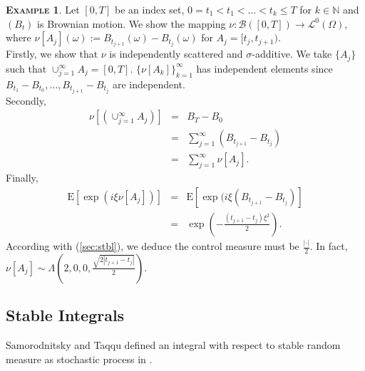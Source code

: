 \documentclass[a4paper, twoside, 11pt]{article}
\theoremstyle{definition}
\newtheorem{example}[definition]{\scshape Example}
\newcommand{\brkt}[1]{\left({#1} \right)}
\begin{document}
  \begin{example}
	Let $[0, T]$ be an index set, $0= t_1 < t_1 <\dots < t_k \le T$ for $k\in \mathbb{N}$ and $(B_{t})$ is Brownian motion.  We show the mapping $\nu : \mathscr{B}([0, T]) \rightarrow \mathcal{L}^0(\Omega)$, where $\nu[A_j](\omega):= B_{t_{j+1}}(\omega) - B_{t_{j}}(\omega)$ for $A_j=[t_{j}, t_{j+1})$.\\
	  Firstly, we show that $\nu$ is independently scattered and $\sigma$-additive. We take $\{A_j\}$ such that $\cup_{j=1}^{\infty}A_j = [0, T]$. $\{\nu[A_k]\}_{k=1}^{\infty}$ has independent elements since $B_{t_1} - B_{t_0}, \dots,  B_{t_{j+1}}- B_{t_{j}} $ are independent.\\
	  Secondly, 
	  \begin{eqnarray*}
		\nu[\brkt{\cup_{j=1}^{\infty}A_j}] &=& B_T - B_{0}\\
		&=& \sum_{j=1}^{\infty} (B_{t_{j+1}} - B_{t_j})\\
		&=& \sum_{j=1}^{\infty} \nu[A_j].
	  \end{eqnarray*}
	  Finally, 
	  \begin{eqnarray*}
		\mathrm{E}[\exp(i\xi\nu[A_j])] &=& \mathrm{E}[\exp(i\xi(B_{t_{j+1}} - B_{t_{j}})]\\
		&=& \exp(-\frac{(t_{j+1}-t_j)\xi^2}{2}).
	  \end{eqnarray*}
	  According with (\ref{sec:stbl}), we deduce the control measure must be $\frac{|\cdot|}{2}$. In fact, $\nu[A_j] \sim \Lambda(2, 0, 0, \frac{\sqrt{2|t_{j+1} - t_j|}}{2})$.
	\label{sec:ex2}
  \end{example}

  \subsection{Stable Integrals}
  Samorodnitsky and Taqqu defined an integral with respect to stable random measure as stochastic process in \cite{samorodnitsky}. 
\end{document}

